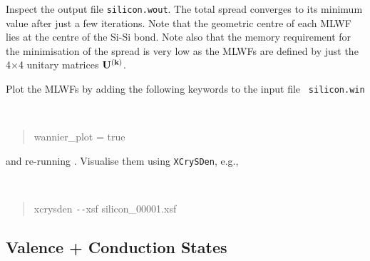 \documentclass[a4paper,11pt,twoside]{article}
\begin{document}
Inspect the output file {\tt silicon.wout}. The total spread converges to its
minimum value after just a few iterations. Note that the geometric centre of
each MLWF lies at the centre of the Si-Si bond.
Note also that the memory requirement for the minimisation of
the spread is very low as the MLWFs are defined 
by just the 4$\times$4 unitary matrices $\mathbf{U}^{(\mathbf{k})}$. 

Plot the MLWFs by adding the following keywords to the input file {\tt
  silicon.win} 
{\tt
\begin{quote}
wannier\_plot = true
\end{quote} }
and re-running \wannier. Visualise them using {\tt XCrySDen}, e.g.,
{\tt
\begin{quote}
xcrysden \texttt{-{}-}xsf silicon\_00001.xsf
\end{quote} }

\subsection*{Valence + Conduction States}
\end{document}
